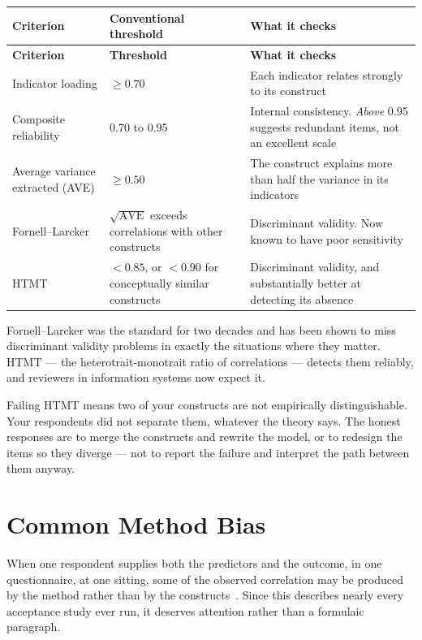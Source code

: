 \begin{center}
\small
\begin{longtable}{@{}L{3.6cm}L{3.6cm}L{6.6cm}@{}}
\toprule
\textbf{Criterion} & \textbf{Conventional threshold} & \textbf{What it checks} \\
\midrule
\endfirsthead
\toprule
\textbf{Criterion} & \textbf{Threshold} & \textbf{What it checks} \\
\midrule
\endhead
\bottomrule
\endfoot
Indicator loading
  & $\ge 0.70$
  & Each indicator relates strongly to its construct \\
Composite reliability
  & 0.70 to 0.95
  & Internal consistency. \emph{Above} 0.95 suggests redundant items, not an
    excellent scale \\
Average variance extracted (AVE)
  & $\ge 0.50$
  & The construct explains more than half the variance in its indicators \\
Fornell--Larcker
  & $\sqrt{\text{AVE}}$ exceeds correlations with other constructs
  & Discriminant validity. Now known to have poor sensitivity \\
HTMT
  & $< 0.85$, or $< 0.90$ for conceptually similar constructs
  & Discriminant validity, and substantially better at detecting its
    absence~\cite{henseler2015new} \\
\end{longtable}
\end{center}

\begin{conceptbox}
Fornell--Larcker was the standard for two decades and has been shown to miss
discriminant validity problems in exactly the situations where they matter.
HTMT --- the heterotrait-monotrait ratio of correlations --- detects them
reliably, and reviewers in information systems now expect it.

\medskip
Failing HTMT means two of your constructs are not empirically distinguishable.
Your respondents did not separate them, whatever the theory says. The honest
responses are to merge the constructs and rewrite the model, or to redesign the
items so they diverge --- not to report the failure and interpret the path
between them anyway.
\end{conceptbox}

\section{Common Method Bias}

When one respondent supplies both the predictors and the outcome, in one
questionnaire, at one sitting, some of the observed correlation may be produced
by the method rather than by the constructs~\cite{podsakoff2003common}. Since
this describes nearly every acceptance study ever run, it deserves attention
rather than a formulaic paragraph.

